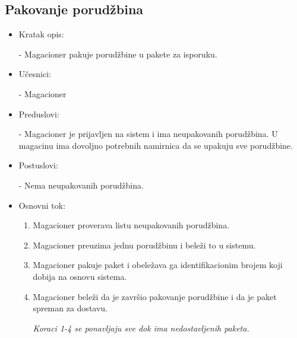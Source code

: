
\subsection{Pakovanje porudžbina}
	\begin{itemize}
		\item{Kratak opis:} 
		
		- Magacioner pakuje porudžbine u pakete za isporuku.
		\item{Učesnici:} 
		
		- Magacioner
		\item{Preduslovi:}
		
		- Magacioner je prijavljen na sistem i ima neupakovanih porudžbina. U magacinu ima dovoljno potrebnih namirnica da se upakuju sve porudžbine.
		\item{Postuslovi:}
		
		- Nema neupakovanih porudžbina.
		\item{Osnovni tok:}
		\begin{enumerate}
			\item{Magacioner proverava listu neupakovanih porudžbina.}
			\item{Magacioner preuzima jednu porudžbinu i beleži to u sistemu.}
			\item{Magacioner pakuje paket i obeležava ga identifikacionim brojem koji dobija na osnovu sistema.}
			\item{Magacioner beleži da je završio pakovanje porudžbine i da je paket spreman za dostavu.}

			\textit{Koraci 1-4 se ponavljaju sve dok ima nedostavljenih paketa.}
		\end{enumerate}

	\end{itemize}
